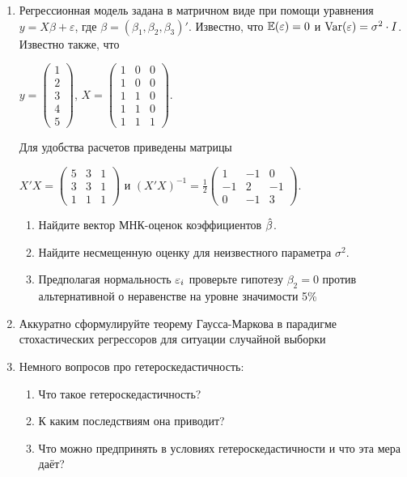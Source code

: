 \documentclass[12pt, a4paper]{article}\usepackage[]{graphicx}\usepackage[]{color}
\begin{document}
\begin{enumerate}
\item Регрессионная модель  задана в матричном виде при помощи уравнения $y=X\beta+\varepsilon$, где $\beta=(\beta_1,\beta_2,\beta_3)'$.
Известно, что $\mathbb{E}(\varepsilon)=0$  и  $\operatorname{Var}(\varepsilon)=\sigma^2\cdot I$.
Известно также, что

$y=\left(
\begin{array}{c}
1\\
2\\
3\\
4\\
5
\end{array}\right)$,
$X=\left(\begin{array}{ccc}
1 & 0 & 0 \\
1 & 0 & 0 \\
1 & 1 & 0 \\
1 & 1 & 0 \\
1 & 1 & 1
\end{array}\right)$.


Для удобства расчетов приведены матрицы


$X'X=\left(
\begin{array}{ccc}
5 & 3 & 1\\
3 & 3 & 1\\
1 & 1 & 1
\end{array}\right)$ и $(X'X)^{-1}=\frac{1}{2}\left(
\begin{array}{ccc}
1 & -1 & 0 \\
-1 & 2 & -1 \\
0 & -1 & 3
\end{array}\right)$.

\begin{enumerate}
\item Найдите вектор МНК-оценок коэффициентов $\hat{\beta}$.
\item Найдите несмещенную оценку для неизвестного параметра $\sigma^2$.
\item Предполагая нормальность $\varepsilon_i$ проверьте гипотезу $\beta_2=0$ против альтернативной о неравенстве на уровне значимости 5\%

\end{enumerate}

\item Аккуратно сформулируйте теорему Гаусса-Маркова в парадигме стохастических регрессоров для ситуации случайной выборки

\item Немного вопросов про гетероскедастичность:
\begin{enumerate}
\item Что такое гетероскедастичность?
\item К каким последствиям она приводит?
\item Что можно предпринять в условиях гетероскедастичности и что эта мера даёт?
\end{enumerate}


\end{enumerate}
\end{document}
